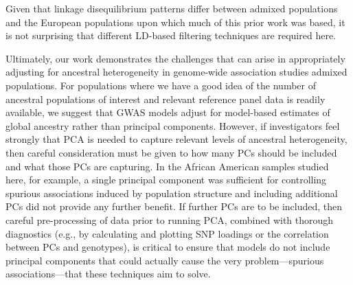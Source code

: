 \documentclass[12pt]{article}
\newcommand{\edit}[1]{{\color{red}{#1}}}
\newcommand{\add}[1]{{\color{red}{[... #1 ...]}}}
\begin{document}
Given that linkage disequilibrium patterns differ between admixed populations and the European populations upon which much of this prior work was based, %
it is not surprising that different LD-based filtering techniques are required here.

Ultimately, our work demonstrates the challenges that can arise in appropriately adjusting for ancestral heterogeneity in genome-wide association studies admixed populations.
For populations where we have a good idea of the number of ancestral populations of interest and relevant reference panel data is readily available, we suggest that GWAS models adjust for model-based estimates of global ancestry rather than principal components. 
However, if investigators feel strongly that PCA is needed to capture relevant levels of ancestral heterogeneity, then careful consideration must be given to how many PCs should be included and what those PCs are capturing. 
In the African American samples studied here, for example, a single principal component was sufficient for controlling spurious associations induced by population structure and including additional PCs did not provide any further benefit.
If further PCs are to be included, then careful pre-processing of data prior to running PCA, combined with thorough diagnostics (e.g., by calculating and plotting SNP loadings or the correlation between PCs and genotypes), is critical to ensure that models do not include principal components that could actually cause the very problem---spurious associations---that these techniques aim to solve.
\end{document}
